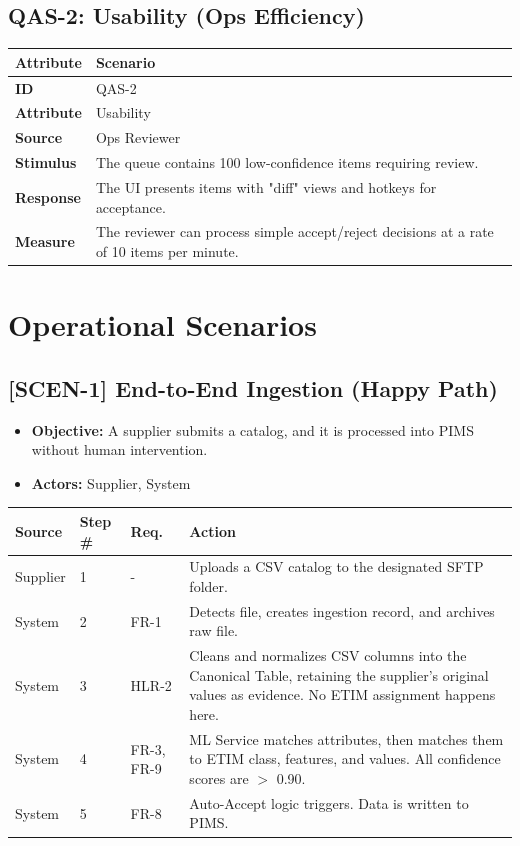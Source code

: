 \documentclass[12pt, a4paper]{article}
\begin{document}
\subsection*{QAS-2: Usability (Ops Efficiency)}
\begin{longtable}{@{}lp{12cm}@{}}
\toprule
\textbf{Attribute} & \textbf{Scenario} \\
\midrule
\textbf{ID} & QAS-2 \\
\textbf{Attribute} & Usability \\
\textbf{Source} & Ops Reviewer \\
\textbf{Stimulus} & The queue contains 100 low-confidence items requiring review. \\
\textbf{Response} & The UI presents items with "diff" views and hotkeys for acceptance. \\
\textbf{Measure} & The reviewer can process simple accept/reject decisions at a rate of 10 items per minute. \\
\bottomrule
\end{longtable}

\newpage
\section{Operational Scenarios}

\subsection*{[SCEN-1] End-to-End Ingestion (Happy Path)}
\begin{itemize}
    \item \textbf{Objective:} A supplier submits a catalog, and it is processed into PIMS without human intervention.
    \item \textbf{Actors:} Supplier, System
\end{itemize}

\begin{longtable}{@{}llp{2cm}p{8cm}@{}}
\toprule
\textbf{Source} & \textbf{Step \#} & \textbf{Req.} & \textbf{Action} \\
\midrule
Supplier & 1 & - & Uploads a CSV catalog to the designated SFTP folder. \\
System & 2 & FR-1 & Detects file, creates ingestion record, and archives raw file. \\
System & 3 & HLR-2 & Cleans and normalizes CSV columns into the Canonical Table, retaining the supplier's original values as evidence. No ETIM assignment happens here. \\
System & 4 & FR-3, FR-9 & ML Service matches attributes, then matches them to ETIM class, features, and values. All confidence scores are $>$ 0.90. \\
System & 5 & FR-8 & Auto-Accept logic triggers. Data is written to PIMS. \\
\bottomrule
\end{longtable}
\end{document}

